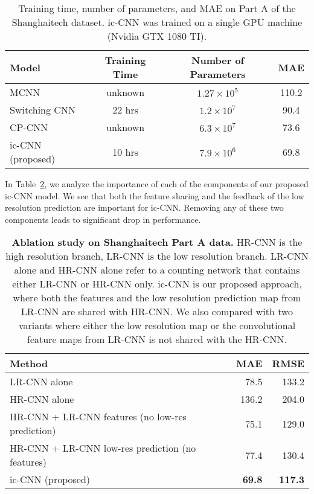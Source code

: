 \documentclass[runningheads]{llncs}
\begin{document}
\setlength{\tabcolsep}{10pt}
\begin{table}[!t]
\centering
\caption{Training time, number of parameters, and MAE on Part A of the Shanghaitech dataset. ic-CNN was trained on a single GPU  machine (Nvidia GTX 1080 TI). \label{tab:Rebuttal-trainingtime}}
\begin{tabular}{lccc}
\toprule
Model         & Training Time  &Number of Parameters & MAE \\
\midrule

MCNN ~\cite{zhang2016single}         &     unknown          &         $1.27 \times 10^5$        & 110.2    \\
Switching CNN~\cite{sam2017switching} &     22 hrs                 &    $1.2 \times 10^7$      &  90.4   \\
CP-CNN ~\cite{sindagi2017generating}       & unknown         &         $6.3 \times 10^7$         & 73.6    \\
ic-CNN (proposed)  &     10 hrs                  &    $7.9 \times 10^6$       & 69.8 \\
\bottomrule
\end{tabular}
\end{table}



In Table~\ref{tab:tableablation}, we analyze the importance of each of the components of our proposed ic-CNN model. We see that both the feature sharing  and the feedback of the low resolution prediction are important for ic-CNN. Removing any of these two components leads to significant drop in performance.

\begin{table}[!t]
\centering
\caption{{\bf Ablation study on Shanghaitech Part A data.} HR-CNN is the high resolution branch, LR-CNN is the low resolution branch. LR-CNN alone and HR-CNN alone  refer to a counting network that contains either LR-CNN or HR-CNN only. ic-CNN is our proposed approach, where both the features and the low resolution prediction map from LR-CNN are shared with HR-CNN. We also compared with two variants where either the low resolution map or the convolutional feature maps from LR-CNN is not shared with the HR-CNN. \label{tab:tableablation}}
\begin{tabular}{lrr}
\toprule
Method     & MAE   & RMSE   \\
\midrule
LR-CNN alone   & 78.5 & 133.2\\
HR-CNN alone  & 136.2  & 204.0 \\
HR-CNN + LR-CNN features (no low-res prediction) & 75.1  & 129.0\\
HR-CNN + LR-CNN low-res prediction (no features) & 77.4 & 130.4 \\
ic-CNN (proposed)  & \textbf{69.8} &  \textbf{117.3}\\
\bottomrule
\end{tabular}
\end{table}
\end{document}
